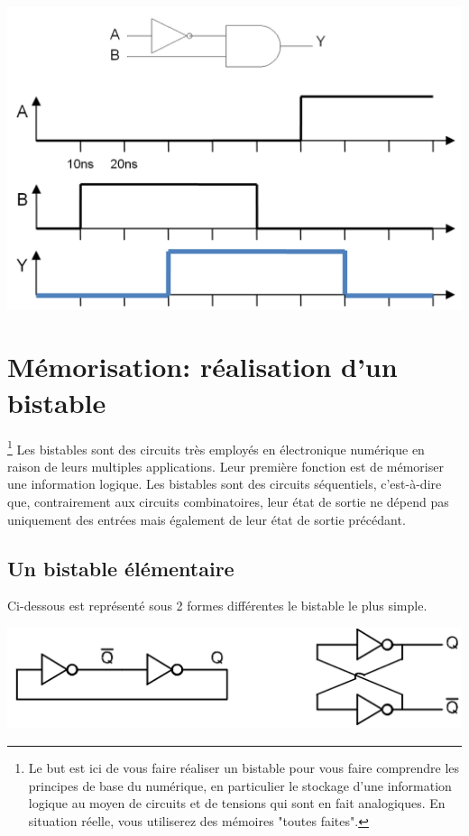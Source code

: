 {%
\begin{center}
\includegraphics[scale=0.6]{Labo3_Chronogramme_sol.png}
\end{center}
}

\section{Mémorisation: réalisation d'un bistable}\footnote{Le but est ici de vous faire réaliser un bistable pour vous faire comprendre les principes de base du numérique, en particulier le stockage d'une information logique au moyen de circuits et de tensions qui sont en fait analogiques. En situation réelle, vous utiliserez des mémoires "toutes faites".}
Les bistables sont des circuits très employés en électronique numérique en raison de leurs multiples
applications. Leur première fonction est de mémoriser une information logique.
Les bistables sont des circuits séquentiels, c'est-à-dire que, contrairement aux circuits combinatoires, leur état de sortie ne dépend pas uniquement des entrées mais également de leur état de sortie précédant.

\subsection{Un bistable élémentaire}
Ci-dessous est représenté sous 2 formes différentes le bistable le plus simple.
\begin{center}
\includegraphics[scale=0.35]{Labo3_Bistableelementaire.png}
\end{center}


